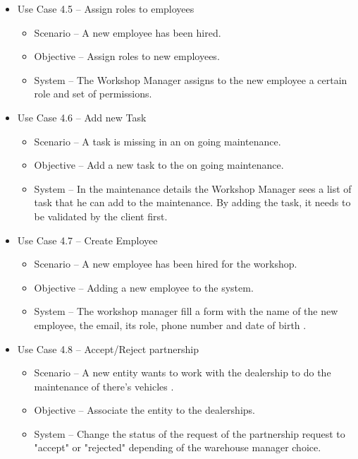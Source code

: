 \begin{itemize}
\begin{itemize}
  \end{itemize}
  \item Use Case 4.5 – Assign roles to employees
  \begin{itemize}
    \item Scenario – A new employee has been hired.
    \item Objective –  Assign roles to new employees.
    \item System – The Workshop Manager assigns to the new employee a certain role and set of permissions.
  \end{itemize}
  \item Use Case 4.6 – Add new Task
  \begin{itemize}
    \item Scenario – A task is missing in an on going maintenance.
    \item Objective – Add a new task to the on going maintenance.
    \item System – In the maintenance details the Workshop Manager sees a list of task that he can add to the maintenance. By adding the task, it needs to be validated by the client first.
  \end{itemize}
  \item Use Case 4.7 – Create Employee
  \begin{itemize}
    \item Scenario – A new employee has been hired for the workshop.
    \item Objective – Adding a new employee to the system.
    \item System – The workshop manager fill a form with the name of the new employee, the email, its role, phone number and date of birth .
  \end{itemize}
    \item Use Case 4.8 – Accept/Reject partnership
  \begin{itemize}
    \item Scenario – A new entity wants to work with the dealership to do the maintenance of there's vehicles .
    \item Objective – Associate the entity to the dealerships.
    \item System – Change the status of the request of the partnership request to "accept" or "rejected" depending of the warehouse manager choice.
  \end{itemize}

\end{itemize}
\hfill \break


